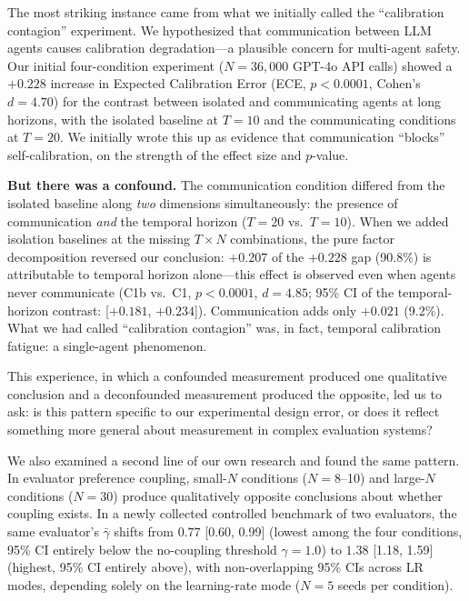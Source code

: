 \documentclass[11pt]{article}
\begin{document}
The most striking instance came from what we initially called the ``calibration contagion'' experiment. We hypothesized that communication between LLM agents causes calibration degradation---a plausible concern for multi-agent safety. Our initial four-condition experiment ($N{=}36{,}000$ GPT-4o API calls) showed a $+0.228$ increase in Expected Calibration Error (ECE, $p < 0.0001$, Cohen's $d = 4.70$) for the contrast between isolated and communicating agents at long horizons, with the isolated baseline at $T{=}10$ and the communicating conditions at $T{=}20$. We initially wrote this up as evidence that communication ``blocks'' self-calibration, on the strength of the effect size and $p$-value.

\textbf{But there was a confound.} The communication condition differed from the isolated baseline along \emph{two} dimensions simultaneously: the presence of communication \emph{and} the temporal horizon ($T{=}20$ vs.\ $T{=}10$). When we added isolation baselines at the missing $T{\times}N$ combinations, the pure factor decomposition reversed our conclusion: $+0.207$ of the $+0.228$ gap (90.8\%) is attributable to temporal horizon alone---this effect is observed even when agents never communicate (C1b vs.\ C1, $p<0.0001$, $d=4.85$; 95\% CI of the temporal-horizon contrast: [$+0.181$, $+0.234$]). Communication adds only $+0.021$ (9.2\%). What we had called ``calibration contagion'' was, in fact, temporal calibration fatigue: a single-agent phenomenon.

This experience, in which a confounded measurement produced one qualitative conclusion and a deconfounded measurement produced the opposite, led us to ask: is this pattern specific to our experimental design error, or does it reflect something more general about measurement in complex evaluation systems?

We also examined a second line of our own research and found the same pattern. In evaluator preference coupling, small-$N$ conditions ($N{=}8$--10) and large-$N$ conditions ($N{=}30$) produce qualitatively opposite conclusions about whether coupling exists. In a newly collected controlled benchmark of two evaluators, the same evaluator's $\bar{\gamma}$ shifts from $0.77$ [0.60, 0.99] (lowest among the four conditions, 95\% CI entirely below the no-coupling threshold $\gamma{=}1.0$) to $1.38$ [1.18, 1.59] (highest, 95\% CI entirely above), with non-overlapping 95\% CIs across LR modes, depending solely on the learning-rate mode ($N{=}5$ seeds per condition).
\end{document}
